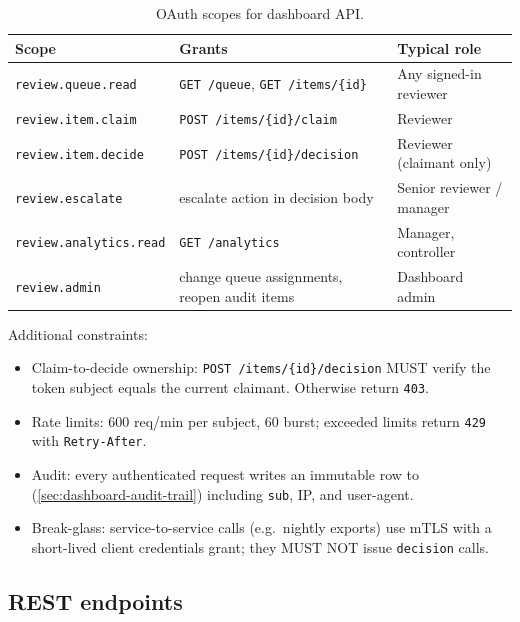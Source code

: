 \documentclass[11pt,a4paper,twoside]{report}
\begin{document}
\begin{table}[htbp]
\centering
\caption{OAuth scopes for dashboard API.}
\label{tab:dashboard-api-scopes}
\footnotesize
\begin{tabularx}{\linewidth}{@{}l X X@{}}
\toprule
\textbf{Scope} & \textbf{Grants} & \textbf{Typical role} \\ \midrule
\texttt{review.queue.read} & \texttt{GET /queue}, \texttt{GET /items/\{id\}} & Any signed-in reviewer \\
\texttt{review.item.claim} & \texttt{POST /items/\{id\}/claim} & Reviewer \\
\texttt{review.item.decide} & \texttt{POST /items/\{id\}/decision} & Reviewer (claimant only) \\
\texttt{review.escalate} & escalate action in decision body & Senior reviewer / manager \\
\texttt{review.analytics.read} & \texttt{GET /analytics} & Manager, controller \\
\texttt{review.admin} & change queue assignments, reopen audit items & Dashboard admin \\
\bottomrule
\end{tabularx}
\end{table}

\noindent
Additional constraints:
\begin{itemize}
\item Claim-to-decide ownership: \texttt{POST
/items/\{id\}/decision} MUST verify the token subject equals
the current claimant. Otherwise return \texttt{403}.
\item Rate limits: 600 req/min per subject, 60 burst; exceeded
limits return \texttt{429} with \texttt{Retry-After}.
\item Audit: every authenticated request writes an immutable
row to 
(\cref{sec:dashboard-audit-trail}) including
\texttt{sub}, IP, and user-agent.
\item Break-glass: service-to-service calls (e.g.\ nightly
exports) use mTLS with a short-lived client credentials
grant; they MUST NOT issue \texttt{decision} calls.
\end{itemize}

\subsection{REST endpoints}
\end{document}

